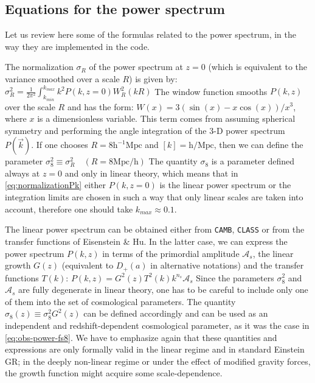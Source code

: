 \subsection{Equations for the power spectrum}

Let us review here some of the formulas related to the power spectrum, in the way they are implemented in the \fito 
code. 

The normalization
$\sigma_{R}$ of the power spectrum at $z=0$ (which is equivalent to the variance
smoothed over a scale $R$) is given by:
\beeqp$\label{eq:normalizationPk}
\sigma_{R}^2=\frac{1}{2\pi^{2}}\int_{k_{min}}^{k_{max}}k^{2}P(k,z=0)W_{R}^{2}(kR)
$
The window function smooths $P(k,z)$ over the scale $R$ and has
the form: $W(x)=3(\sin(x)-x\cos(x))/x^{3}$, where $x$ is a dimensionless
variable. This term comes from assuming spherical symmetry and performing
the angle integration of the 3-D power spectrum $P(\vec{k})$. If
one chooses $R=8\mbox{h}^{-1}\mbox{Mpc}$ and $[k]=\mbox{h}/\mbox{Mpc}$,
then we can define the parameter  
\beeqp$
\sigma_{8}^{2} \equiv \sigma_{R}^2 \quad (R=8\textrm{Mpc/h})
$
The quantity
$\sigma_{8}$ is a parameter defined always at $z=0$ and only in linear theory, which means
that in \cref{eq:normalizationPk} either $P(k,z=0)$ is the linear power spectrum
or the integration limits are chosen in such a way that only linear
scales are taken into account, therefore one should take
$k_{max}\approx0.1$. 

The linear power spectrum can be obtained either from \texttt{CAMB}, \texttt{CLASS}
or from the transfer functions of Eisenstein \& Hu. In the latter case,
we can express the power spectrum $P(k,z)$
in terms of the primordial amplitude $\mathcal{A}_{s}$, the linear growth $G(z)$ (equivalent to $D_{+}(a)$ in alternative notations) and
the transfer functions $T(k)$: 
\beeqp$
P(k,z)= G^{2}(z)T^{2}(k)k^{n_s}\mathcal{A}_{s}
$
Since the parameters $\sigma_{8}^{2}$ and $\mathcal{A}_{s}$ are fully degenerate in linear theory,
one has to be careful to include only one of them into the set of cosmological parameters.
The quantity $\sigma_{8}(z) \equiv \sigma_{8}^{2}G^{2}(z)$
can be defined accordingly and can be used as an independent and redshift-dependent
cosmological parameter, as it was the case in \cref{eq:obs-power-fs8}. 
We have to emphasize again that these quantities and expressions are only formally 
valid in the linear regime and in standard Einstein GR;
in the deeply non-linear regime or under the effect of modified gravity forces,
the growth function might acquire some scale-dependence.


